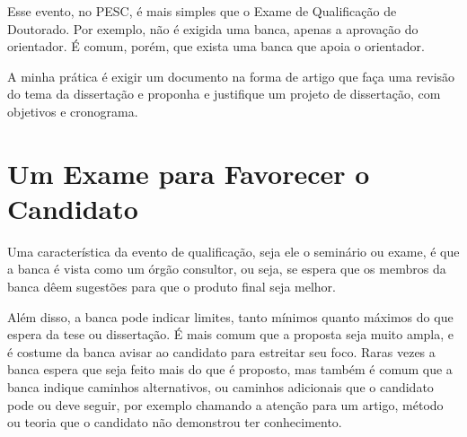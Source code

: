 Esse evento, no PESC, é mais simples que o Exame de Qualificação de Doutorado. Por exemplo, não é exigida uma banca, apenas a aprovação do orientador. É comum, porém, que exista uma banca que apoia o orientador.

A minha prática é exigir um documento na forma de artigo que faça uma revisão do tema da dissertação e proponha e justifique um projeto de dissertação, com objetivos e cronograma.

\section{Um Exame para Favorecer o Candidato}

Uma característica da evento de qualificação, seja ele o seminário ou exame, é que a banca é vista como um órgão consultor, ou seja, se espera que os membros da banca dêem sugestões para que o produto final seja melhor. 

Além disso, a banca pode indicar limites, tanto mínimos quanto máximos do que espera da tese ou dissertação. É mais comum que a proposta seja muito ampla, e é costume da banca avisar ao candidato para estreitar seu foco. Raras vezes a banca espera que seja feito mais do que é proposto, mas também é comum que a banca indique caminhos alternativos, ou caminhos adicionais que o candidato pode ou deve seguir, por exemplo chamando a atenção para um artigo, método ou teoria que o candidato não demonstrou ter conhecimento.
